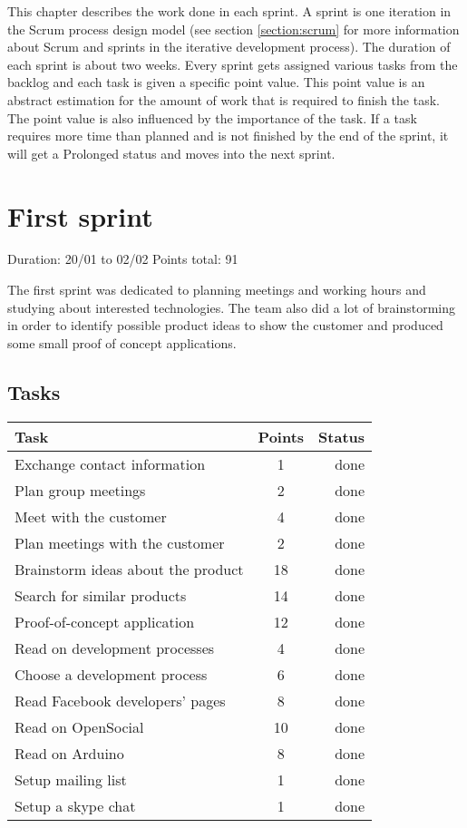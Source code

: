 
This chapter describes the work done in each sprint. A sprint is one iteration in the Scrum process design model 
(see section \ref{section:scrum} for more information about Scrum and sprints in the iterative development process). 
The duration of each sprint is about two weeks. Every sprint gets assigned various tasks from the backlog 
and each task is given a specific point value. This point value is an abstract estimation for the amount of work 
that is required to finish the task. The point value is also influenced by the importance of the task.
 If a task requires more time than planned and is not finished by the end of the sprint, it will get a 
Prolonged status and moves into the next sprint.

\section{First sprint}

Duration: 20/01 to 02/02
Points total: 91

The first sprint was dedicated to planning meetings and working hours
and studying about interested technologies. The team also did a lot of
brainstorming in order to identify possible product ideas to show the
customer and produced some small proof of concept applications.

\subsection{Tasks}

\begin{table}[ht!]
\begin{tabular}{ | l | c | r | }

\hline
\textbf{Task} & \textbf{Points} & \textbf{Status} \\
\hline

Exchange contact information		& 1  & done \\
\hline
Plan group meetings					& 2  & done \\
\hline
Meet with the customer				& 4  & done \\
\hline
Plan meetings with the customer		& 2  & done \\
\hline
Brainstorm ideas about the product	& 18 & done \\
\hline
Search for similar products			& 14 & done \\
\hline
Proof-of-concept application		& 12 & done \\
\hline
Read on development processes		& 4  & done \\
\hline
Choose a development process		& 6  & done \\
\hline
Read Facebook developers' pages		& 8  & done \\
\hline
Read on OpenSocial					& 10 & done \\
\hline
Read on Arduino						& 8  & done \\
\hline
Setup mailing list					& 1  & done \\
\hline
Setup a skype chat					& 1  & done \\
\hline

\end{tabular}
\end{table}



